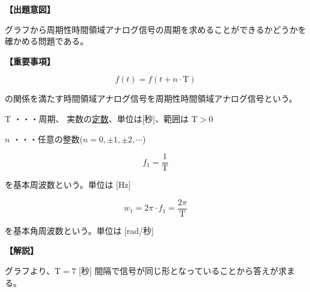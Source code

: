 \noindent \textbf{【出題意図】}

\noindent グラフから周期性時間領域アナログ信号の周期を求めることができるかどうかを確かめる問題である。

\vspace{1em}
\noindent \textbf{【重要事項】}

\[
f(t) = f(t + n \cdot \textrm{T})
\]

\noindent の関係を満たす時間領域アナログ信号を周期性時間領域アナログ信号という。

\medskip
\noindent $\textrm{T}$ ・・・周期、 実数の\underline{定数}、単位は[秒]、範囲は $\textrm{T} > 0$

\medskip
\noindent $n$ ・・・任意の整数($n = 0,\pm1,\pm2,\cdots$)

\[
f_1 = \frac{1}{\textrm{T}}
\]

\noindent を基本周波数という。単位は [Hz]

\[
w_1 = 2\pi \cdot f_1 = \frac{2\pi}{\textrm{T}}
\]

\noindent を基本角周波数という。単位は [rad/秒] 


\vspace{1em}
\noindent \textbf{【解説】}

\noindent グラフより、$\textrm{T}=7$ [秒] 間隔で信号が同じ形となっていることから答えが求まる。
